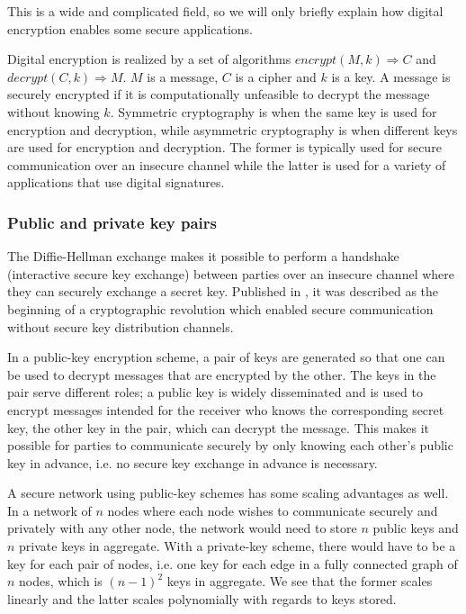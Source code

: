 This is a wide and complicated field, so we will only briefly explain how digital encryption enables some secure applications.

Digital encryption is realized by a set of algorithms $encrypt(M, k) \Rightarrow C$ and $decrypt(C, k) \Rightarrow M$. $M$ is a message, $C$ is a cipher and $k$ is a key. A message is securely encrypted if it is computationally unfeasible to decrypt the message without knowing $k$. Symmetric cryptography is when the same key is used for encryption and decryption, while asymmetric cryptography is when different keys are used for encryption and decryption. The former is typically used for secure communication over an insecure channel while the latter is used for a variety of applications that use digital signatures. 

\subsubsection{Public and private key pairs}

The Diffie-Hellman exchange makes it possible to perform a handshake (interactive secure key exchange) between parties over an insecure channel where they can securely exchange a secret key. Published in \cite{diffie1976new}, it was described as the beginning of a cryptographic revolution which enabled secure communication without secure key distribution channels. 

In a public-key encryption scheme, a pair of keys are generated so that one can be used to decrypt messages that are encrypted by the other. The keys in the pair serve different roles; a public key is widely disseminated and is used to encrypt messages intended for the receiver who knows the corresponding secret key, the other key in the pair, which can decrypt the message. \cite[p.~370]{lindell2014introduction} This makes it possible for parties to communicate securely by only knowing each other's public key in advance, i.e. no secure key exchange in advance is necessary. 

A secure network using public-key schemes has some scaling advantages as well. In a network of $n$ nodes where each node wishes to communicate securely and privately with any other node, the network would need to store $n$ public keys and $n$ private keys in aggregate. With a private-key scheme, there would have to be a key for each pair of nodes, i.e. one key for each edge in a fully connected graph of $n$ nodes, which is $(n-1)^2$ keys in aggregate. We see that the former scales linearly and the latter scales polynomially with regards to keys stored. 

